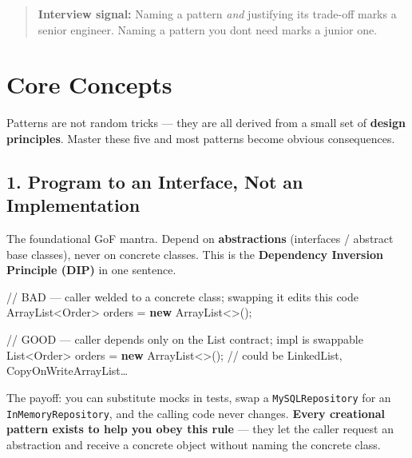 \documentclass[11pt]{article}
\newenvironment{Shaded}{\begin{snugshade}}{\end{snugshade}}
\newcommand{\BuiltInTok}[1]{\textcolor[rgb]{0.50,0.55,0.55}{#1}}
\newcommand{\CommentTok}[1]{\textcolor[rgb]{0.48,0.49,0.49}{#1}}
\newcommand{\KeywordTok}[1]{\textcolor[rgb]{0.81,0.81,0.76}{\textbf{#1}}}
\newcommand{\NormalTok}[1]{\textcolor[rgb]{0.81,0.81,0.76}{#1}}
\newcommand{\OperatorTok}[1]{\textcolor[rgb]{0.81,0.81,0.76}{#1}}
\begin{document}
\begin{quote}
\textbf{Interview signal:} Naming a pattern \emph{and} justifying its trade-off marks a senior engineer. Naming a pattern you don\textquotesingle t need marks a junior one.
\end{quote}

\section{Core Concepts}\label{core-concepts}

Patterns are not random tricks --- they are all derived from a small set of \textbf{design principles}. Master these five and most patterns become obvious consequences.

\subsection{1. Program to an Interface, Not an Implementation}\label{1-program-to-an-interface-not-an-implementation}

The foundational GoF mantra. Depend on \textbf{abstractions} (interfaces / abstract base classes), never on concrete classes. This is the \textbf{Dependency Inversion Principle (DIP)} in one sentence.


\begin{Shaded}
\begin{Highlighting}[]
\CommentTok{// BAD — caller welded to a concrete class; swapping it edits this code}
\BuiltInTok{ArrayList}\OperatorTok{\textless{}}\NormalTok{Order}\OperatorTok{\textgreater{}}\NormalTok{ orders }\OperatorTok{=} \KeywordTok{new} \BuiltInTok{ArrayList}\OperatorTok{\textless{}\textgreater{}();}

\CommentTok{// GOOD — caller depends only on the List contract; impl is swappable}
\BuiltInTok{List}\OperatorTok{\textless{}}\NormalTok{Order}\OperatorTok{\textgreater{}}\NormalTok{ orders }\OperatorTok{=} \KeywordTok{new} \BuiltInTok{ArrayList}\OperatorTok{\textless{}\textgreater{}();}   \CommentTok{// could be LinkedList, CopyOnWriteArrayList…}
\end{Highlighting}
\end{Shaded}

The payoff: you can substitute mocks in tests, swap a \texttt{MySQLRepository} for an \texttt{InMemoryRepository}, and the calling code never changes. \textbf{Every creational pattern exists to help you obey this rule} --- they let the caller request an abstraction and receive a concrete object without naming the concrete class.
\end{document}

